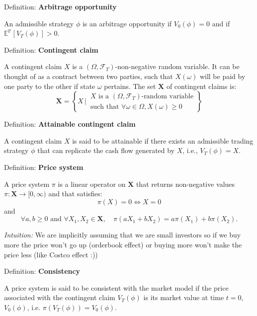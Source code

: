 \documentclass[12pt,a4paper]{article}
\begin{document}
Definition: \textbf{Arbitrage opportunity}
\vspace{0.5em}

An admissible strategy $\phi$ is an arbitrage opportunity if $V_0(\phi) = 0$ and if $\mathbb{E}^{\mathbb{P}}[V_T(\phi)] > 0$.
\vspace{1em}

Definition: \textbf{Contingent claim}
\vspace{0.5em}

A contingent claim $X$ is a $(\Omega, \mathcal{F}_T)$-non-negative random variable. It can be thought of as a contract between two parties, such that $X(\omega)$ will be paid by one party to the other if state $\omega$ pertains. The set $\mathbf{X}$ of contingent claims is:
\[
\mathbf{X} = \left\{ X \,\bigg|\, \begin{array}{l} X \text{ is a } (\Omega, \mathcal{F}_T)\text{-random variable} \\ \text{such that } \forall \omega \in \Omega, X(\omega) \geq 0 \end{array} \right\}
\]
\vspace{1em}

Definition: \textbf{Attainable contingent claim}
\vspace{0.5em}

A contingent claim $X$ is said to be attainable if there exists an admissible trading strategy $\phi$ that can replicate the cash flow generated by $X$, i.e., $V_T(\phi) = X$.
\vspace{1em}

Definition: \textbf{Price system}
\vspace{0.5em}

A price system $\pi$ is a linear operator on $\mathbf{X}$ that returns non-negative values $\pi : \mathbf{X} \to [0, \infty)$ and that satisfies:
\[
\pi(X) = 0 \Leftrightarrow X = 0
\]
and
\[
\forall a, b \geq 0 \text{ and } \forall X_1, X_2 \in \mathbf{X}, \quad \pi(aX_1 + bX_2) = a\pi(X_1) + b\pi(X_2).
\]

\textit{Intuition:} We are implicitly assuming that we are small investors so if we buy more the price won't go up (orderbook effect) or buying more won't make the price less (like Costco effect :))
\vspace{1em}

Definition: \textbf{Consistency}
\vspace{0.5em}

A price system is said to be consistent with the market model if the price associated with the contingent claim $V_T(\phi)$ is its market value at time $t = 0$, $V_0(\phi)$, i.e. $\pi(V_T(\phi)) = V_0(\phi)$.
\end{document}

